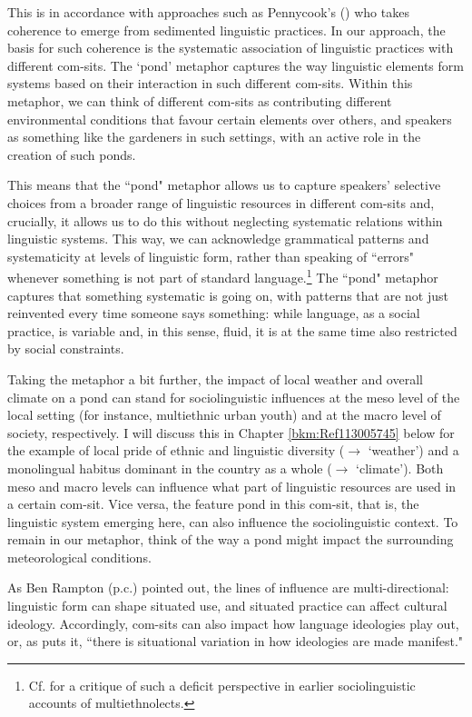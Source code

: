 This is in accordance with approaches such as Pennycook's (\citeyear{Pennycook2010}) who takes coherence to emerge from sedimented linguistic practices. In our approach, the basis for such coherence is the systematic association of linguistic practices with different com-sits. The ‘pond’ metaphor captures the way linguistic elements form systems based on their interaction in such different com-sits. Within this metaphor, we can think of different com-sits as contributing different environmental conditions that favour certain elements over others, and speakers as something like the gardeners in such settings, with an active role in the creation of such ponds.

This means that the “pond" metaphor allows us to capture speakers’ selective choices from a broader range of linguistic resources in different com-sits and, crucially, it allows us to do this without neglecting systematic relations within linguistic systems. This way, we can acknowledge grammatical patterns and systematicity at levels of linguistic form, rather than speaking of “errors" whenever something is not part of standard language.\footnote{Cf. \citet{Wiese2013} for a critique of such a deficit perspective in earlier sociolinguistic accounts of multiethnolects.} The “pond" metaphor captures that something systematic is going on, with patterns that are not just reinvented every time someone says something: while language, as a social practice, is variable and, in this sense, fluid, it is at the same time also restricted by social constraints.

Taking the metaphor a bit further, the impact of local weather and overall climate on a pond can stand for sociolinguistic influences at the meso level of the local setting (for instance, multiethnic urban youth) and at the macro level of society, respectively. I will discuss this in Chapter \ref{bkm:Ref113005745} below for the example of local pride of ethnic and linguistic diversity ($\rightarrow$ ‘weather’) and a monolingual habitus dominant in the country as a whole ($\rightarrow$ ‘climate’). Both meso and macro levels can influence what part of linguistic resources are used in a certain com-sit. Vice versa, the feature pond in this com-sit, that is, the linguistic system emerging here, can also influence the sociolinguistic context. To remain in our metaphor, think of the way a pond might impact the surrounding meteorological conditions.

As Ben Rampton (p.c.) pointed out, the lines of influence are multi-directional: linguistic form can shape situated use, and situated practice can affect cultural ideology. Accordingly, com-sits can also impact how language ideologies play out, or, as \citet[120]{Fuller2018} puts it, “there is situational variation in how ideologies are made manifest."

